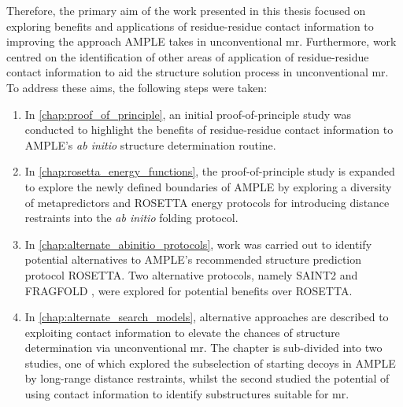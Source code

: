 Therefore, the primary aim of the work presented in this thesis focused on exploring benefits and applications of residue-residue contact information to improving the approach AMPLE takes in unconventional \gls{mr}. Furthermore, work centred on the identification of other areas of application of residue-residue contact information to aid the structure solution process in unconventional \gls{mr}. To address these aims, the following steps were taken:

\begin{enumerate}
    \item In \cref{chap:proof_of_principle}, an initial proof-of-principle study was conducted to highlight the benefits of residue-residue contact information to AMPLE's \textit{ab initio} structure determination routine.
    \item In \cref{chap:rosetta_energy_functions}, the proof-of-principle study is expanded to explore the newly defined boundaries of AMPLE by exploring a diversity of metapredictors and ROSETTA energy protocols for introducing distance restraints into the \textit{ab initio} folding protocol.
    \item In \cref{chap:alternate_abinitio_protocols}, work was carried out to identify potential alternatives to AMPLE's recommended structure prediction protocol ROSETTA. Two alternative protocols, namely SAINT2 \cite{De_Oliveira2017-sg} and FRAGFOLD \cite{Kosciolek2014-bt}, were explored for potential benefits over ROSETTA.
    \item In \cref{chap:alternate_search_models}, alternative approaches are described to exploiting contact information to elevate the chances of structure determination via unconventional \gls{mr}. The chapter is sub-divided into two studies, one of which explored the subselection of starting decoys in AMPLE by long-range distance restraints, whilst the second studied the potential of using contact information to identify substructures suitable for \gls{mr}.
\end{enumerate}
